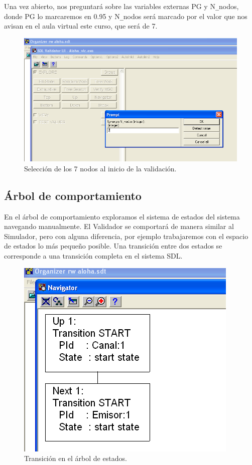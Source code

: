 \documentclass{article}
\begin{document}
\quad

Una vez abierto, nos preguntará sobre las variables externas PG y N\verb|_|nodos, donde PG lo marcaremos en 0.95 y N\verb|_|nodos será marcado por el valor que nos avisan en el aula virtual este curso, que será de 7.

\begin{figure}[h]
    \centering
    \includegraphics[width=0.80\linewidth]{src/variable 7nodos.png}
    \caption{\label{fig:simulador7nodos} Selección de los 7 nodos al inicio de la validación.}
\end{figure}

\subsection{Árbol de comportamiento}

En el árbol de comportamiento exploramos el sistema de estados del sistema navegando manualmente. El Validador se comportará de manera similar al Simulador, pero con alguna diferencia, por ejemplo trabajaremos con el espacio de estados lo más pequeño posible. Una transición entre dos estados se corresponde a una transición completa en el sistema SDL. 

\begin{figure}[h]
    \centering
    \includegraphics[width=0.35\linewidth]{src/arbol estados.png}
    \caption{\label{fig:arbolestados} Transición en el árbol de estados.}
\end{figure}
\end{document}
